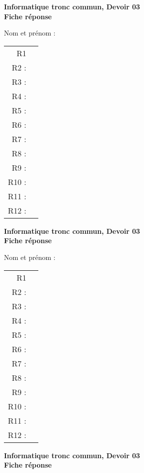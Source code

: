 \documentclass[francais,a4paper,div=19,12 pt]{scrartcl}
\begin{document}
\pagestyle{empty}
\newcommand{\rep}{\fbox{\phantom{\raisebox{0pt}[.5cm][.3cm]{}\makebox[9.5cm]{}}}}
\begin{center}
 \textbf{Informatique tronc commun, Devoir 03}\\
 \textbf{Fiche réponse}
\end{center}

\medskip{}
 Nom  et prénom : \hfill 

\bigskip{}

\centerline{}
\medskip{}
\begin{center}
\begin{tabular}{rc}
R1  & \rep \\[1 em] 
R2 : & \rep \\[1 em] 
R3 : & \rep \\[1 em] 
R4 : & \rep \\[1 em] 
R5 : & \rep \\[1 em] 
R6 : & \rep \\[1 em] 
R7 : & \rep \\[1 em] 
R8 : & \rep \\[1 em] 
R9 : & \rep \\[1 em] 
R10 : & \rep \\[1 em] 
R11 : & \rep \\[1 em] 
R12 : & \rep \\[1 em] 
\end{tabular}
\end{center}\newpage
\begin{center}
 \textbf{Informatique tronc commun, Devoir 03}\\
 \textbf{Fiche réponse}
\end{center}

\medskip{}
 Nom  et prénom : \hfill 

\bigskip{}

\centerline{}
\medskip{}
\begin{center}
\begin{tabular}{rc}
R1  & \rep \\[1 em] 
R2 : & \rep \\[1 em] 
R3 : & \rep \\[1 em] 
R4 : & \rep \\[1 em] 
R5 : & \rep \\[1 em] 
R6 : & \rep \\[1 em] 
R7 : & \rep \\[1 em] 
R8 : & \rep \\[1 em] 
R9 : & \rep \\[1 em] 
R10 : & \rep \\[1 em] 
R11 : & \rep \\[1 em] 
R12 : & \rep \\[1 em] 
\end{tabular}
\end{center}\newpage
\begin{center}
 \textbf{Informatique tronc commun, Devoir 03}\\
 \textbf{Fiche réponse}
\end{center}
\end{document}
